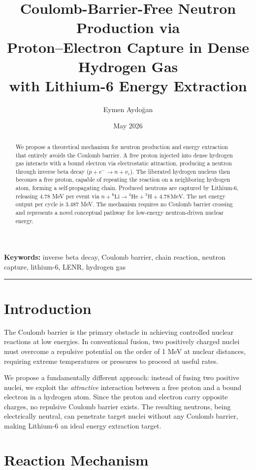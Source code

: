 \documentclass[12pt,a4paper]{article}
\title{\textbf{Coulomb-Barrier-Free Neutron Production via\\
Proton--Electron Capture in Dense Hydrogen Gas\\
with Lithium-6 Energy Extraction}}
\author{Eymen Aydoğan}
\date{May 2026}
\begin{document}
\maketitle

\begin{abstract}
We propose a theoretical mechanism for neutron production and energy
extraction that entirely avoids the Coulomb barrier. A free proton
injected into dense hydrogen gas interacts with a bound electron via
electrostatic attraction, producing a neutron through inverse beta
decay ($p + e^- \rightarrow n + \nu_e$). The liberated hydrogen
nucleus then becomes a free proton, capable of repeating the reaction
on a neighboring hydrogen atom, forming a self-propagating chain.
Produced neutrons are captured by Lithium-6, releasing 4.78 MeV per
event via $n + {}^6\text{Li} \rightarrow {}^4\text{He} + {}^3\text{H}
+ 4.78\,\text{MeV}$. The net energy output per cycle is 3.487 MeV.
The mechanism requires no Coulomb barrier crossing and represents a
novel conceptual pathway for low-energy neutron-driven nuclear energy.
\end{abstract}

\noindent\textbf{Keywords:} inverse beta decay, Coulomb barrier,
chain reaction, neutron capture, lithium-6, LENR, hydrogen gas

\hrule
\vspace{1em}

\section{Introduction}

The Coulomb barrier is the primary obstacle in achieving controlled
nuclear reactions at low energies. In conventional fusion, two
positively charged nuclei must overcome a repulsive potential on the
order of 1 MeV at nuclear distances, requiring extreme temperatures
or pressures to proceed at useful rates.

We propose a fundamentally different approach: instead of fusing two
positive nuclei, we exploit the \emph{attractive} interaction between
a free proton and a bound electron in a hydrogen atom. Since the
proton and electron carry opposite charges, no repulsive Coulomb
barrier exists. The resulting neutrons, being electrically neutral,
can penetrate target nuclei without any Coulomb barrier, making
Lithium-6 an ideal energy extraction target.

\section{Reaction Mechanism}
\end{document}
